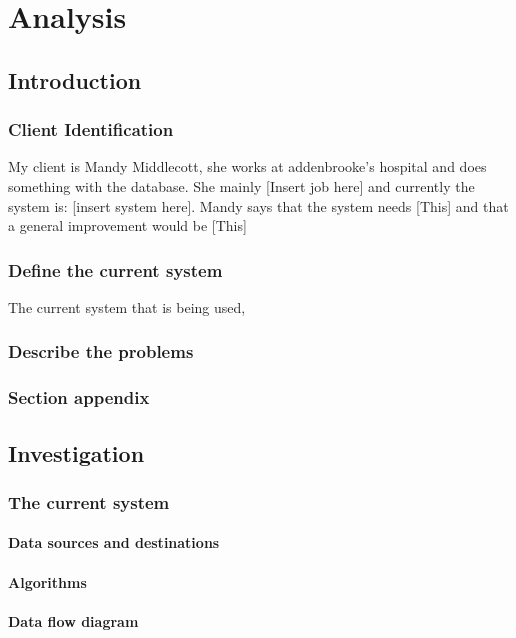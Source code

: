\chapter{Analysis}

\section{Introduction}

\subsection{Client Identification}
My client is Mandy Middlecott, she works at addenbrooke's hospital and does something with the database. She mainly [Insert job here] and currently the system is: [insert system here]. Mandy says that the system needs [This] and that a general improvement would be [This]
\subsection{Define the current system}
The current system that is being used,
\subsection{Describe the problems}

\subsection{Section appendix}

\section{Investigation}

\subsection{The current system}

\subsubsection{Data sources and destinations}

\subsubsection{Algorithms}

\subsubsection{Data flow diagram}


